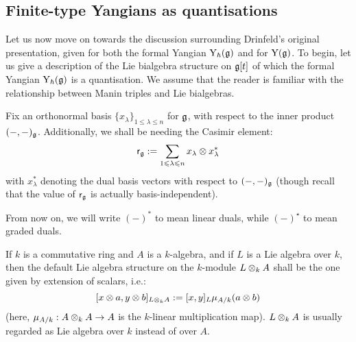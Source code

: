     \subsection{Finite-type Yangians as quantisations}
        Let us now move on towards the discussion surrounding Drinfeld's original presentation, given for both the formal Yangian $\mathrm{Y}_{\hbar}(\mathfrak{g})$ and for $\mathrm{Y}(\mathfrak{g})$. To begin, let us give a description of the Lie bialgebra structure on $\mathfrak{g}[t]$ of which the formal Yangian $\mathrm{Y}_{\hbar}(\mathfrak{g})$ is a quantisation. We assume that the reader is familiar with the relationship between Manin triples and Lie bialgebras.

        \begin{convention}
            Fix an orthonormal basis $\{x_{\lambda}\}_{1 \leq \lambda \leq n}$ for $\mathfrak{g}$, with respect to the inner product $(-, -)_{\mathfrak{g}}$. Additionally, we shall be needing the Casimir element:
                $$\sfr_{\g} := \sum_{1 \leq \lambda \leq n} x_{\lambda} \tensor x_{\lambda}^*$$
            with $x_{\lambda}^*$ denoting the dual basis vectors with respect to $(-, -)_{\mathfrak{g}}$ (though recall that the value of $\mathsf{r}_{\mathfrak{g}}$ is actually basis-independent).
        \end{convention}
        \begin{convention}
            From now on, we will write $(-)^*$ to mean linear duals, while $(-)^{\star}$ to mean graded duals. 
        \end{convention}
        \begin{convention}
            If $k$ is a commutative ring and $A$ is a $k$-algebra, and if $L$ is a Lie algebra over $k$, then the default Lie algebra structure on the $k$-module $L \tensor_k A$ shall be the one given by extension of scalars, i.e.:
                $$[x \tensor a, y \tensor b]_{L \tensor_k A} := [x, y]_L \mu_{A/k}(a \tensor b)$$
            (here, $\mu_{A/k}: A \tensor_k A \to A$ is the $k$-linear multiplication map). $L \tensor_k A$ is usually regarded as Lie algebra over $k$ instead of over $A$.  
        \end{convention}
        
